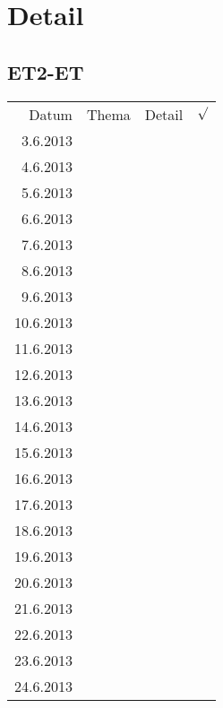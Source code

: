 
\section{Detail}

\subsection{ET2-ET}
\begin{tabular}{r l p{} l}
\rowcolor{lgray} Datum     & Thema         & Detail & $\surd$ \\
\rowcolor{white}  3.6.2013 &               &  &  \\
\rowcolor{lgray}  4.6.2013 &               &  &  \\
\rowcolor{white}  5.6.2013 &               &  &  \\
\rowcolor{lgray}  6.6.2013 &               &  &  \\
\rowcolor{white}  7.6.2013 &               &  &  \\
\rowcolor{lgray}  8.6.2013 &               &  &  \\
\rowcolor{white}  9.6.2013 &               &  &  \\
\rowcolor{lgray} 10.6.2013 &               &  &  \\
\rowcolor{white} 11.6.2013 &               &  &  \\
\rowcolor{lgray} 12.6.2013 &               &  &  \\
\rowcolor{white} 13.6.2013 &               &  &  \\
\rowcolor{lgray} 14.6.2013 &               &  &  \\
\rowcolor{white} 15.6.2013 &               &  &  \\
\rowcolor{lgray} 16.6.2013 &               &  &  \\
\rowcolor{white} 17.6.2013 &               &  &  \\
\rowcolor{lgray} 18.6.2013 &               &  &  \\
\rowcolor{white} 19.6.2013 &               &  &  \\
\rowcolor{lgray} 20.6.2013 &               &  &  \\
\rowcolor{white} 21.6.2013 &               &  &  \\
\rowcolor{lgray} 22.6.2013 &               &  &  \\
\rowcolor{white} 23.6.2013 &               &  &  \\
\rowcolor{lgray} 24.6.2013 &               &  &  \\

\end{tabular}
